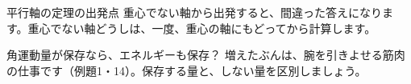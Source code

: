 \begin{tsumazuki}{平行軸の定理の出発点}
重心でない軸から出発すると、間違った答えになります。重心でない軸どうしは、一度、重心の軸にもどってから計算します。
\end{tsumazuki}

\begin{tsumazuki}{角運動量が保存なら、エネルギーも保存？}
増えたぶんは、腕を引きよせる筋肉の仕事です（例題1・14）。保存する量と、しない量を区別しましょう。
\end{tsumazuki}


